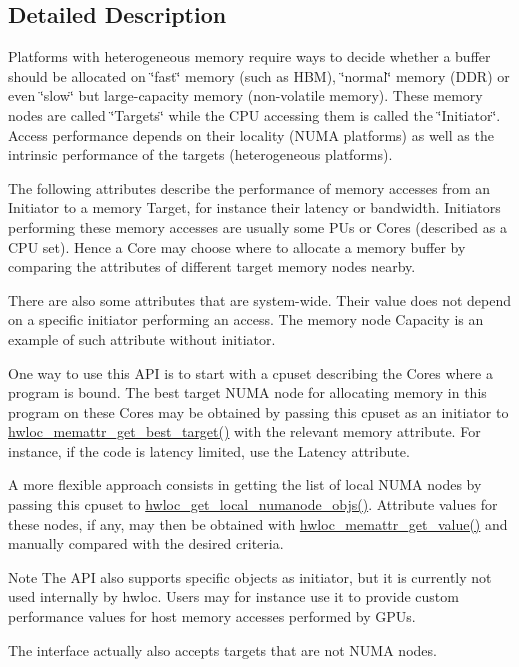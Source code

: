 \subsection{Detailed Description}
Platforms with heterogeneous memory require ways to decide whether a buffer should be allocated on \char`\"{}fast\char`\"{} memory (such as H\+BM), \char`\"{}normal\char`\"{} memory (D\+DR) or even \char`\"{}slow\char`\"{} but large-\/capacity memory (non-\/volatile memory). These memory nodes are called \char`\"{}\+Targets\char`\"{} while the C\+PU accessing them is called the \char`\"{}\+Initiator\char`\"{}. Access performance depends on their locality (N\+U\+MA platforms) as well as the intrinsic performance of the targets (heterogeneous platforms).

The following attributes describe the performance of memory accesses from an Initiator to a memory Target, for instance their latency or bandwidth. Initiators performing these memory accesses are usually some P\+Us or Cores (described as a C\+PU set). Hence a Core may choose where to allocate a memory buffer by comparing the attributes of different target memory nodes nearby.

There are also some attributes that are system-\/wide. Their value does not depend on a specific initiator performing an access. The memory node Capacity is an example of such attribute without initiator.

One way to use this A\+PI is to start with a cpuset describing the Cores where a program is bound. The best target N\+U\+MA node for allocating memory in this program on these Cores may be obtained by passing this cpuset as an initiator to \hyperlink{a00211_ga884d1f2ad745c2fa69c1583c82d28f10}{hwloc\+\_\+memattr\+\_\+get\+\_\+best\+\_\+target()} with the relevant memory attribute. For instance, if the code is latency limited, use the Latency attribute.

A more flexible approach consists in getting the list of local N\+U\+MA nodes by passing this cpuset to \hyperlink{a00211_ga569e80c5be7ef27649b0ef5aa52ffcdc}{hwloc\+\_\+get\+\_\+local\+\_\+numanode\+\_\+objs()}. Attribute values for these nodes, if any, may then be obtained with \hyperlink{a00211_ga297e4a9adc2272446a4c7449dacef0df}{hwloc\+\_\+memattr\+\_\+get\+\_\+value()} and manually compared with the desired criteria.

\begin{DoxyNote}{Note}
The A\+PI also supports specific objects as initiator, but it is currently not used internally by hwloc. Users may for instance use it to provide custom performance values for host memory accesses performed by G\+P\+Us.

The interface actually also accepts targets that are not N\+U\+MA nodes. 
\end{DoxyNote}


